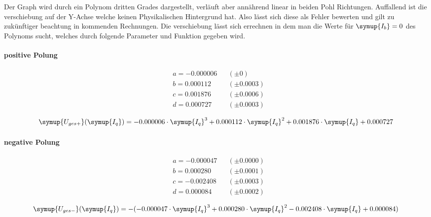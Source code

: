 Der Graph wird durch ein Polynom dritten Grades dargestellt, verläuft aber annährend linear in beiden Pohl Richtungen. Auffallend ist die verschiebung auf der Y-Achse %
welche keinen Physikalischen Hintergrund hat. Also lässt sich diese als Fehler bewerten und gilt zu zukünftiger beachtung in kommenden Rechnungen.
Die verschiebung lässt sich errechnen in dem man die Werte für $\symup{I_b}=0$ des Polynoms sucht, welches durch folgende Parameter und Funktion gegeben wird.
\paragraph{positive Polung}

\begin{align*}
   &a = -0.000006 &&(\pm 0) \\
   &b = 0.000112 &&(\pm 0.0003)\\
   &c = 0.001876 &&(\pm 0.0006) \\
   &d = 0.000727 &&(\pm 0.0003) 
\end{align*}

\begin{equation}
   \symup{U_{ges+}}(\symup{I_q})=-0.000006 \cdot \symup{I_q}^3 + 0.000112\cdot\symup{I_q}^2 + 0.001876 \cdot\symup{I_q} + 0.000727 
\end{equation}

\paragraph{negative Polung} 

\begin{align*}
   &a = -0.000047 &&(\pm 0.0000) \\
   &b = 0.000280 &&(\pm 0.0001 ) \\
   &c = -0.002408 &&(\pm 0.0003) \\
   &d = 0.000084 &&(\pm 0.0002 ) 
\end{align*}
 
\begin{equation}
   \symup{U_{ges-}}(\symup{I_q})=-(-0.000047 \cdot \symup{I_q}^3 + 0.000280\cdot\symup{I_q}^2 -0.002408\cdot\symup{I_q} + 0.000084)
\end{equation}

%
%

